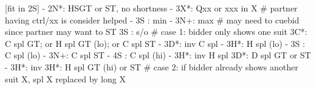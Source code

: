 [fit in 2S] - 
2N*: HSGT or ST, no shortness
   - 3X*: Qxx or xxx in X  # partner having ctrl/xx is consider helped
   - 3S : min
   - 3N+: max  # may need to cuebid since partner may want to ST
3S : s/o 
# case 1: bidder only shows one suit
3C*: C spl GT; or H spl GT (lo); or C spl ST
   - 3D*: inv C spl
        - 3H*: H spl (lo)
        - 3S : C spl (lo)
        - 3N+: C spl ST
        - 4S : C spl (hi)
   - 3H*: inv H spl
3D*: D spl GT or ST
   - 3H*: inv
3H*: H spl GT (hi) or ST
# case 2: if bidder already shows another suit X, spl X replaced by long X
